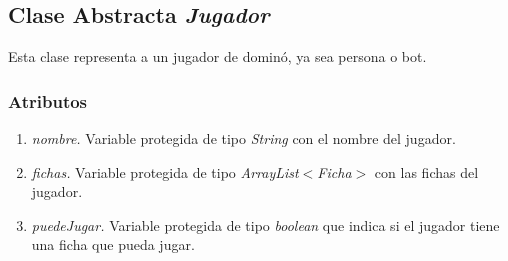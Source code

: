 \documentclass[12pt]{article}
\begin{document}
  \subsection{Clase Abstracta \textit{Jugador}}
  Esta clase representa a un jugador de dominó, ya sea persona o bot.

  \subsubsection{Atributos}
  \begin{enumerate}
    \item \textit{nombre.} Variable protegida de tipo \textit{String} con el nombre del jugador.
    \item \textit{fichas.} Variable protegida de tipo \textit{ArrayList$<$Ficha$>$} con las fichas del jugador.
    \item \textit{puedeJugar.} Variable protegida de tipo \textit{boolean} que indica si el jugador tiene una ficha que pueda jugar.
  \end{enumerate}
\end{document}
